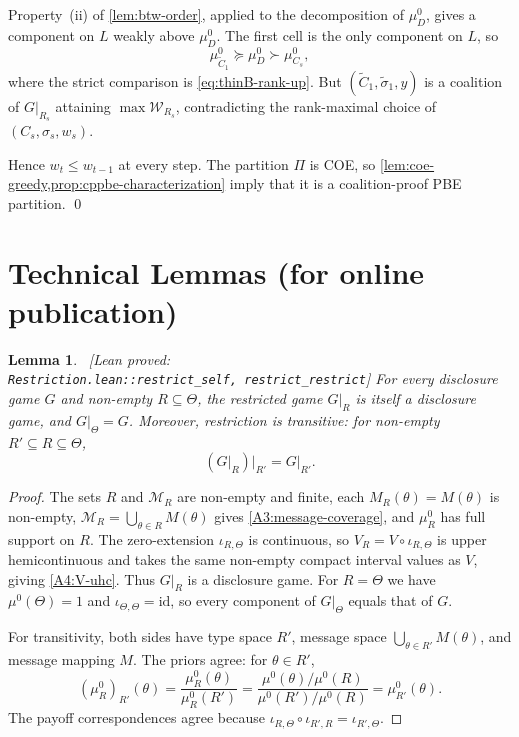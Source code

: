\documentclass[11pt]{article}
\newtheorem{lemma}{Lemma}
\newcommand{\Msg}{\mathcal{M}}
\newcommand{\W}{\mathcal{W}}
\newcommand{\leanproved}[1]{{\footnotesize\textsf{\textcolor{green!55!black}{[Lean proved: \texttt{#1}]}}}}
\begin{document}
Property~(ii) of \cref{lem:btw-order}, applied to the decomposition of $\mu^0_D$, gives a component on $L$ weakly above $\mu^0_D$. The first cell is the only component on $L$, so
\[
    \mu^0_{\widetilde C_1}
    \succeq
    \mu^0_D
    \succ
    \mu^0_{C_s},
\]
where the strict comparison is \eqref{eq:thinB-rank-up}. But $(\widetilde C_1,\widetilde\sigma_1,y)$ is a coalition of $G\vert_{R_s}$ attaining $\max\W_{R_s}$, contradicting the rank-maximal choice of $(C_s,\sigma_s,w_s)$.

Hence $w_t\leq w_{t-1}$ at every step. The partition $\Pi$ is COE, so \cref{lem:coe-greedy,prop:cppbe-characterization} imply that it is a coalition-proof PBE partition. \qed

\section{Technical Lemmas (for online publication)}\label{sec:technical}

\begin{lemma}\label{lem:restriction}\ \leanproved{Restriction.lean::restrict\_self,\ restrict\_restrict}
    For every disclosure game $G$ and non-empty $R\subseteq\Theta$, the restricted game $G\vert_R$ is itself a disclosure game, and $G\vert_\Theta=G$. Moreover, restriction is transitive: for non-empty $R'\subseteq R\subseteq\Theta$,
    \[
        (G\vert_R)\vert_{R'}=G\vert_{R'}.
    \]
\end{lemma}
\begin{proof}
    The sets $R$ and $\Msg_R$ are non-empty and finite, each $M_R(\theta)=M(\theta)$ is non-empty, $\Msg_R=\bigcup_{\theta\in R}M(\theta)$ gives \cref{A3:message-coverage}, and $\mu^0_R$ has full support on $R$. The zero-extension $\iota_{R,\Theta}$ is continuous, so $V_R=V\circ\iota_{R,\Theta}$ is upper hemicontinuous and takes the same non-empty compact interval values as $V$, giving \cref{A4:V-uhc}. Thus $G\vert_R$ is a disclosure game. For $R=\Theta$ we have $\mu^0(\Theta)=1$ and $\iota_{\Theta,\Theta}=\mathrm{id}$, so every component of $G\vert_\Theta$ equals that of $G$.

    For transitivity, both sides have type space $R'$, message space $\bigcup_{\theta\in R'}M(\theta)$, and message mapping $M$. The priors agree: for $\theta\in R'$,
    \[
        (\mu^0_R)_{R'}(\theta)=\frac{\mu^0_R(\theta)}{\mu^0_R(R')}=\frac{\mu^0(\theta)/\mu^0(R)}{\mu^0(R')/\mu^0(R)}=\mu^0_{R'}(\theta).
    \]
    The payoff correspondences agree because $\iota_{R,\Theta}\circ\iota_{R',R}=\iota_{R',\Theta}$.
\end{proof}
\end{document}

